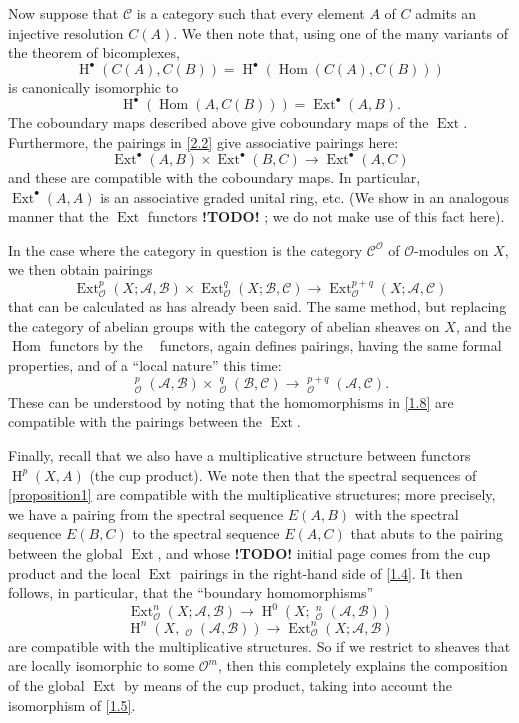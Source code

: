 \documentclass{article}
\theoremstyle{plain}
\theoremstyle{definition}
\newcommand{\sh}{\mathscr}
\newcommand{\cat}{\mathcal}
\DeclareMathOperator{\Ext}{Ext}
\DeclareMathOperator{\Hom}{Hom}
\DeclareMathOperator{\shExt}{\underline{Ext}}
\DeclareMathOperator{\shHom}{\underline{Hom}}
\DeclareMathOperator{\HH}{H}
\newcommand{\todo}{\textbf{ !TODO! }}
\newcommand{\oldpage}[1]{\marginpar{\footnotesize$\Big\vert$ \textit{p.~#1}}}
\begin{document}
Now suppose that $\cat{C}$ is a category such that every element $A$ of $C$ admits an injective resolution $C(A)$.
We then note that, using one of the many variants of the theorem of bicomplexes,
\[
  \HH^\bullet(C(A),C(B)) = \HH^\bullet(\Hom(C(A),C(B)))
\]
is canonically isomorphic to
\[
  \HH^\bullet(\Hom(A,C(B))) = \Ext^\bullet(A,B).
\]
The coboundary maps described above give coboundary maps of the $\Ext$.
Furthermore, the pairings in \cref{2.2} give associative pairings here:
\[
\label{2.3}
  \Ext^\bullet(A,B)\times\Ext^\bullet(B,C) \to \Ext^\bullet(A,C)
\tag{2.3}
\]
and these are compatible with the coboundary maps.
In particular, $\Ext^\bullet(A,A)$ is an associative graded unital ring, etc.
(We show in an analogous manner that the $\Ext$ functors \todo;
we do not make use of this fact here).

In the case where the category in question is the category $\cat{C}^\sh{O}$ of $\sh{O}$-modules on $X$, we then obtain pairings
\[
\label{2.4}
  \Ext_\sh{O}^p(X;\sh{A},\sh{B})\times\Ext_\sh{O}^q(X;\sh{B},\sh{C}) \to \Ext_\sh{O}^{p+q}(X;\sh{A},\sh{C})
\tag{2.4}
\]
that can be calculated as has already been said.
The same method, but replacing the category of abelian groups with the category of abelian sheaves on $X$, and the $\Hom$ functors by the $\shHom$ functors, again defines pairings, having the same formal properties, and of a ``local nature'' this time:
\[
\label{2.5}
  \shExt_\sh{O}^p(\sh{A},\sh{B})\times\shExt_\sh{O}^q(\sh{B},\sh{C}) \to \shExt_\sh{O}^{p+q}(\sh{A},\sh{C}).
\tag{2.5}
\]
These can be understood by noting that the homomorphisms in \cref{1.8} are compatible with the pairings between the $\Ext$.

\oldpage{149-05}
Finally, recall that we also have a multiplicative structure between functors $\HH^p(X,A)$ (the cup product).
We note then that the spectral sequences of \cref{proposition1} are compatible with the multiplicative structures;
more precisely, we have a pairing from the spectral sequence $E(A,B)$ with the spectral sequence $E(B,C)$ to the spectral sequence $E(A,C)$ that abuts to the pairing between the global $\Ext$, and whose \todo initial page comes from the cup product and the local $\Ext$ pairings in the right-hand side of \cref{1.4}.
It then follows, in particular, that the ``boundary homomorphisms''
\[
\label{2.6}
  \Ext_\sh{O}^n(X;\sh{A},\sh{B}) \to \HH^0(X;\shExt_\sh{O}^n(\sh{A},\sh{B}))
\tag{2.6}
\]
\[
\label{2.7}
  \HH^n(X,\shHom_\sh{O}(\sh{A},\sh{B})) \to \Ext_\sh{O}^n(X;\sh{A},\sh{B})
\tag{2.7}
\]
are compatible with the multiplicative structures.
So if we restrict to sheaves that are locally isomorphic to some $\sh{O}^m$, then this completely explains the composition of the global $\Ext$ by means of the cup product, taking into account the isomorphism of \cref{1.5}.
\end{document}
